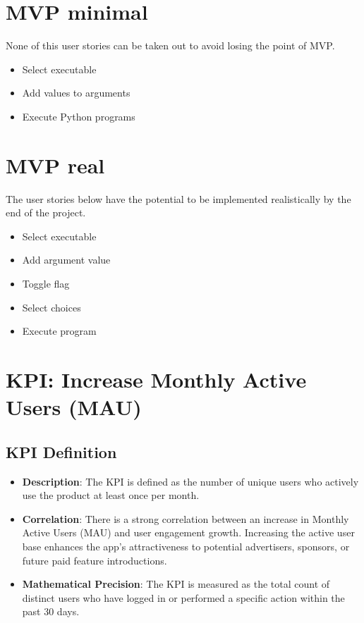 \documentclass{article}
\begin{document}
\section{MVP minimal}
None of this user stories can be taken out to avoid losing the point of MVP.
\begin{itemize}
    \item Select executable
    \item Add values to arguments
    \item Execute Python programs
\end{itemize}

\section{MVP real}
The user stories below have the potential to be implemented realistically by the end of the project.
\begin{itemize}
    \item Select executable
    \item Add argument value
    \item Toggle flag
    \item Select choices
    \item Execute program
\end{itemize}

\section{KPI: Increase Monthly Active Users (MAU)}

\subsection{KPI Definition}
\begin{itemize}
    \item \textbf{Description}: The KPI is defined as the number of unique users who actively use the product at least once per month.
    \item \textbf{Correlation}: There is a strong correlation between an increase in Monthly Active Users (MAU) and user engagement growth. Increasing the active user base enhances the app's attractiveness to potential advertisers, sponsors, or future paid feature introductions.
    \item \textbf{Mathematical Precision}: The KPI is measured as the total count of distinct users who have logged in or performed a specific action within the past 30 days.
\end{itemize}
\end{document}

